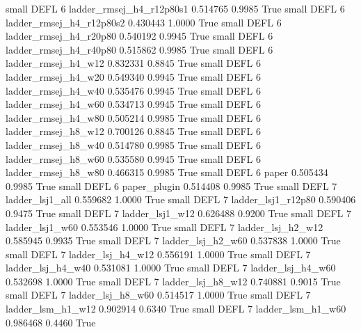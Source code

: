      small     DEFL                 6 ladder_rmsej_h4_r12p80s1   0.514765      0.9985    True
     small     DEFL                 6 ladder_rmsej_h4_r12p80s2   0.430443      1.0000    True
     small     DEFL                 6   ladder_rmsej_h4_r20p80   0.540192      0.9945    True
     small     DEFL                 6   ladder_rmsej_h4_r40p80   0.515862      0.9985    True
     small     DEFL                 6      ladder_rmsej_h4_w12   0.832331      0.8845    True
     small     DEFL                 6      ladder_rmsej_h4_w20   0.549340      0.9945    True
     small     DEFL                 6      ladder_rmsej_h4_w40   0.535476      0.9945    True
     small     DEFL                 6      ladder_rmsej_h4_w60   0.534713      0.9945    True
     small     DEFL                 6      ladder_rmsej_h4_w80   0.505214      0.9985    True
     small     DEFL                 6      ladder_rmsej_h8_w12   0.700126      0.8845    True
     small     DEFL                 6      ladder_rmsej_h8_w40   0.514780      0.9985    True
     small     DEFL                 6      ladder_rmsej_h8_w60   0.535580      0.9945    True
     small     DEFL                 6      ladder_rmsej_h8_w80   0.466315      0.9985    True
     small     DEFL                 6                    paper   0.505434      0.9985    True
     small     DEFL                 6             paper_plugin   0.514408      0.9985    True
     small     DEFL                 7          ladder_lsj1_all   0.559682      1.0000    True
     small     DEFL                 7       ladder_lsj1_r12p80   0.590406      0.9475    True
     small     DEFL                 7          ladder_lsj1_w12   0.626488      0.9200    True
     small     DEFL                 7          ladder_lsj1_w60   0.553546      1.0000    True
     small     DEFL                 7        ladder_lsj_h2_w12   0.585945      0.9935    True
     small     DEFL                 7        ladder_lsj_h2_w60   0.537838      1.0000    True
     small     DEFL                 7        ladder_lsj_h4_w12   0.556191      1.0000    True
     small     DEFL                 7        ladder_lsj_h4_w40   0.531081      1.0000    True
     small     DEFL                 7        ladder_lsj_h4_w60   0.532698      1.0000    True
     small     DEFL                 7        ladder_lsj_h8_w12   0.740881      0.9015    True
     small     DEFL                 7        ladder_lsj_h8_w60   0.514517      1.0000    True
     small     DEFL                 7        ladder_lsm_h1_w12   0.902914      0.6340    True
     small     DEFL                 7        ladder_lsm_h1_w60   0.986468      0.4460    True
